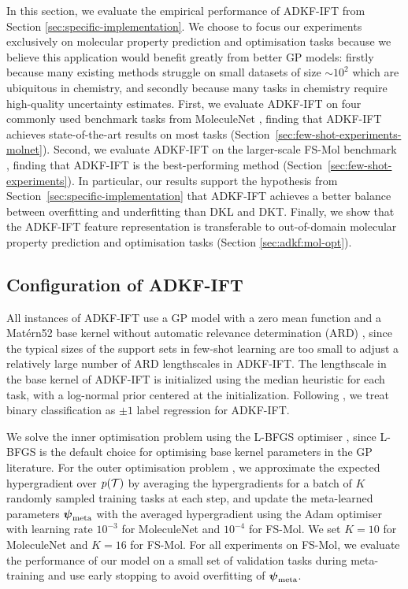     In this section, we evaluate the empirical performance of ADKF-IFT from Section \ref{sec:specific-implementation}.
    We choose to focus our experiments exclusively on molecular property prediction and optimisation tasks
    because we believe this application would benefit greatly from better GP models:
    firstly because many existing methods struggle on small datasets of size $\sim 10^2$ which are ubiquitous in chemistry,
    and secondly because many tasks in chemistry require high-quality uncertainty estimates.
    First, we evaluate ADKF-IFT on four commonly used benchmark tasks from MoleculeNet \citep{wu2018moleculenet},
    finding that ADKF-IFT achieves state-of-the-art results on most tasks (Section~\ref{sec:few-shot-experiments-molnet}).
    Second, we evaluate ADKF-IFT on the larger-scale FS-Mol benchmark \citep{stanley2021fsmol},
    finding that ADKF-IFT is the best-performing method (Section~\ref{sec:few-shot-experiments}).
    In particular, our results support the hypothesis from Section~\ref{sec:specific-implementation}
    that ADKF-IFT achieves a better balance between overfitting and underfitting than DKL and DKT.
    Finally, we show that the ADKF-IFT feature representation is transferable to out-of-domain molecular property prediction and optimisation tasks (Section \ref{sec:adkf:mol-opt}).

    \subsection{Configuration of ADKF-IFT}

    All instances of ADKF-IFT use a GP model with a zero mean function and
    a Mat\'ern52 base kernel without automatic relevance determination (ARD) \citep{Neal1996-pm},
    since the typical sizes of the support sets in few-shot learning are too small to adjust a relatively
    large number of ARD lengthscales in ADKF-IFT.
    The lengthscale in the base kernel of ADKF-IFT is initialized using the median heuristic \citep{garreau2017large}
    for each task, with a log-normal prior centered at the initialization.
    Following \citet{Patacchiola20}, we treat binary classification as $\pm1$ label regression for ADKF-IFT.

    We solve the inner optimisation problem  using the L-BFGS optimiser \citep{liu1989limited},
    since L-BFGS is the default choice for optimising base kernel parameters in the GP literature.
    For the outer optimisation problem , we approximate the expected hypergradient
    over $p(\operatorname{\mathcal{T}})$ by averaging the hypergradients for a batch of $K$ randomly sampled training tasks at each step,
    and update the meta-learned parameters $\operatorname{\boldsymbol{\psi}}_{\text{meta}}$ with the averaged hypergradient using the Adam optimiser \citep{kingma2014adam}
    with learning rate $10^{-3}$ for MoleculeNet and $10^{-4}$ for FS-Mol. We set $K=10$ for MoleculeNet and $K=16$ for FS-Mol.
    For all experiments on FS-Mol, we evaluate the performance of our model on a small set of validation tasks during meta-training
    and use early stopping \citep{prechelt1998early} to avoid overfitting of $\operatorname{\boldsymbol{\psi}}_{\text{meta}}$.
    
